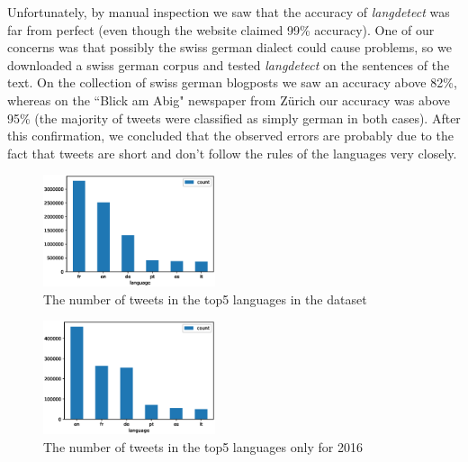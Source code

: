 Unfortunately, by manual inspection we saw that the accuracy of \textit{langdetect} was far from perfect (even though the website claimed 99\% accuracy). One of our concerns was that possibly the swiss german dialect could cause problems, so we downloaded a swiss german corpus and tested \textit{langdetect} on the sentences of the text. On the collection of swiss german blogposts we saw an accuracy above 82\%, whereas on the ``Blick am Abig" newspaper from Z\"urich our accuracy was above 95\% (the majority of tweets were classified as simply german in both cases). After this confirmation, we concluded that the observed errors are probably due to the fact that tweets are short and don't follow the rules of the languages very closely. 


\begin{figure}[h]
  \includegraphics[width=0.45\textwidth]{images/swiss_counts.eps}
  \caption{The number of tweets in the top5 languages in the dataset}
  \label{swiss_counts}
\end{figure}



\begin{figure}[h]
  \includegraphics[width=0.45\textwidth]{images/swiss_counts16.eps}
  \caption{The number of tweets in the top5 languages only for 2016}
  \label{swiss_counts16}
\end{figure}

 

